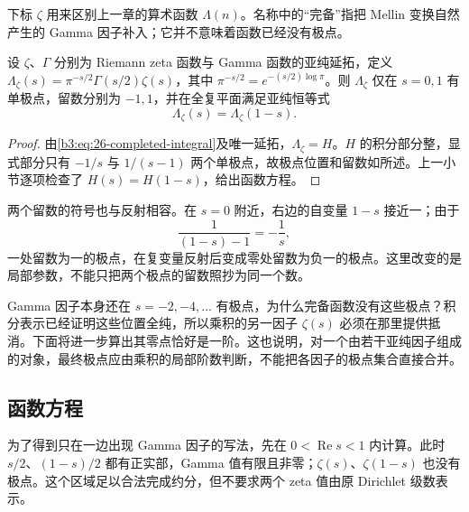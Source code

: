 下标 \(\zeta\) 用来区别上一章的算术函数 \(\Lambda(n)\)。名称中的“完备”指把 Mellin 变换自然产生的 Gamma 因子补入；它并不意味着函数已经没有极点。

\begin{theorem}[完备函数的极点与函数方程]\label{b3:thm:26-completed-equation}
设 \(\zeta\)、\(\Gamma\) 分别为 Riemann zeta 函数与 Gamma 函数的亚纯延拓，定义 \(\Lambda_\zeta(s)=\pi^{-s/2}\Gamma(s/2)\zeta(s)\)，其中 \(\pi^{-s/2}=e^{-(s/2)\log\pi}\)。则 \(\Lambda_\zeta\) 仅在 \(s=0,1\) 有单极点，留数分别为 \(-1,1\)，并在全复平面满足亚纯恒等式
\begin{equation}\label{b3:eq:26-functional-equation}
 \Lambda_\zeta(s)=\Lambda_\zeta(1-s).
\end{equation}
\end{theorem}
\begin{proof}
由\eqref{b3:eq:26-completed-integral}及唯一延拓，\(\Lambda_\zeta=H\)。\(H\) 的积分部分整，显式部分只有 \(-1/s\) 与 \(1/(s-1)\) 两个单极点，故极点位置和留数如所述。上一小节逐项检查了 \(H(s)=H(1-s)\)，给出函数方程。
\end{proof}

两个留数的符号也与反射相容。在 \(s=0\) 附近，右边的自变量 \(1-s\) 接近一；由于
\[
 \frac1{(1-s)-1}=-\frac1s,
\]
一处留数为一的极点，在复变量反射后变成零处留数为负一的极点。这里改变的是局部参数，不能只把两个极点的留数照抄为同一个数。

Gamma 因子本身还在 \(s=-2,-4,\ldots\) 有极点，为什么完备函数没有这些极点？积分表示已经证明这些位置全纯，所以乘积的另一因子 \(\zeta(s)\) 必须在那里提供抵消。下面将进一步算出其零点恰好是一阶。这也说明，对一个由若干亚纯因子组成的对象，最终极点应由乘积的局部阶数判断，不能把各因子的极点集合直接合并。

\subsection{函数方程}
\label{b3:subsec:260403}

为了得到只在一边出现 Gamma 因子的写法，先在 \(0<\operatorname{Re}s<1\) 内计算。此时 \(s/2\)、\((1-s)/2\) 都有正实部，Gamma 值有限且非零；\(\zeta(s)\)、\(\zeta(1-s)\) 也没有极点。这个区域足以合法完成约分，但不要求两个 zeta 值由原 Dirichlet 级数表示。

